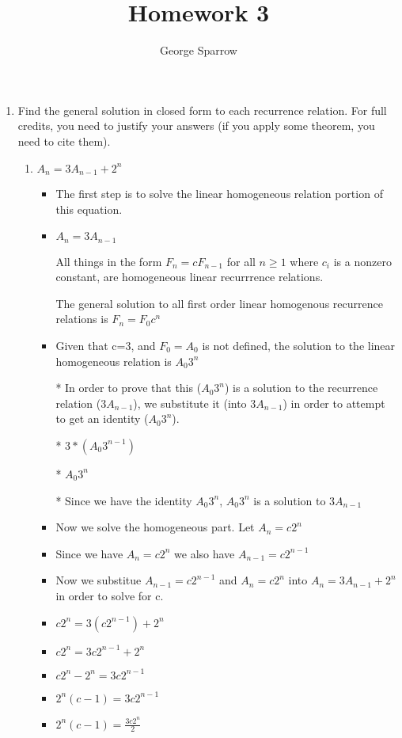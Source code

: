 \documentclass{article}
\title{Homework 3}
\date{\mydate}
\author{George Sparrow}
\begin{document}
\maketitle
\newpage

\begin{enumerate}
\item Find the general solution in closed form to each recurrence relation. For full credits, you need to justify your answers (if you apply some theorem, you need to cite them).
  \begin{enumerate}
  \item $A_{n}=3A_{n-1}+2^{n}$
    \begin{itemize} %
    \item The first step is to solve the linear homogeneous relation portion of this equation.
    \item $A_{n}=3A_{n-1}$
    \item [] All things in the form $F_{n}=cF_{n-1}$ for all $n\geq1$ where $c_{i}$ is a nonzero constant, are homogeneous linear recurrrence relations.
    \item [] The general solution to all first order linear homogenous recurrence relations is $F_{n}=F_{0}c^{n}$
    \item Given that c=3, and $F_{0}=A_{0}$ is not defined, the solution to the linear homogeneous relation is $A_{0}3^{n}$
    \item [*] In order to prove that this ($A_{0}3^{n}$) is a solution to the recurrence relation ($3A_{n-1}$), we substitute it (into $3A_{n-1}$) in order to attempt to get an identity ($A_{0}3^{n}$).
    \item [*] $3*(A_{0}3^{n-1})$
    \item [*] $A_{0}3^{n}$
    \item [*] Since we have the identity $A_{0}3^{n}$, $A_{0}3^{n}$ is a solution to $3A_{n-1}$
    \item Now we solve the homogeneous part. Let $A_{n}=c2^{n}$ 
    \item Since we have $A_{n}=c2^{n}$ we also have $A_{n-1}=c2^{n-1}$
    \item Now we substitue $A_{n-1}=c2^{n-1}$ and $A_{n}=c2^{n}$ into $A_{n}=3A_{n-1}+2^{n}$ in order to solve for c.
    \item $c2^{n}=3(c2^{n-1})+2^{n}$
    \item $c2^{n}=3c2^{n-1}+2^{n}$
    \item $c2^{n}-2^{n}=3c2^{n-1}$
    \item $2^{n}(c-1)=3c2^{n-1}$
    \item $2^{n}(c-1)=\frac{3c2^{n}}{2}$

\end{itemize}
\end{enumerate}
\end{enumerate}
\end{document}
